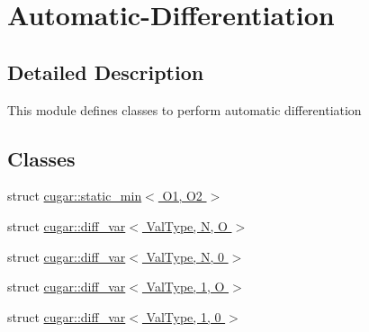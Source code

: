 \hypertarget{group___auto_diff_module}{}\section{Automatic-\/\+Differentiation}
\label{group___auto_diff_module}


\subsection{Detailed Description}
This module defines classes to perform automatic differentiation \subsection*{Classes}
\begin{DoxyCompactItemize}
\item 
struct \hyperlink{structcugar_1_1static__min}{cugar\+::static\+\_\+min$<$ O1, O2 $>$}
\item 
struct \hyperlink{structcugar_1_1diff__var}{cugar\+::diff\+\_\+var$<$ Val\+Type, N, O $>$}
\item 
struct \hyperlink{structcugar_1_1diff__var_3_01_val_type_00_01_n_00_010_01_4}{cugar\+::diff\+\_\+var$<$ Val\+Type, N, 0 $>$}
\item 
struct \hyperlink{structcugar_1_1diff__var_3_01_val_type_00_011_00_01_o_01_4}{cugar\+::diff\+\_\+var$<$ Val\+Type, 1, O $>$}
\item 
struct \hyperlink{structcugar_1_1diff__var_3_01_val_type_00_011_00_010_01_4}{cugar\+::diff\+\_\+var$<$ Val\+Type, 1, 0 $>$}
\end{DoxyCompactItemize}
